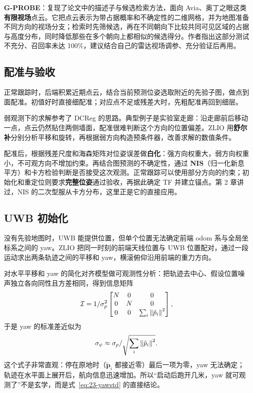 \textbf{G-PROBE}\cite{gprobe2026}：复现了论文中的描述子与候选检索方法，面向 Avia、奥丁之眼这类\textbf{有限视场}点云。它把点云表示为带占据概率和不确定性的二维网格，并为地图准备不同方向的视场分支；检索时先筛候选，再在不同朝向下比较共同可见区域的占据与高度分布，同时降低那些在多个朝向上都相似的候选得分。作者指出这部分测试不充分、召回率未达 100\%，建议结合自己的雷达视场调参、充分验证后再用。

\subsection{配准与验收}

正常跟踪时，后端积累近期点云，结合当前预测位姿选取附近的先验子图，做点到面配准。初值好时直接细配准；对应点不足或残差大时，先粗配准再回到细层。

弱观测下的求解参考了 DCReg 的思路。典型例子是实验室走廊：沿走廊前后移动一点，点云仍然贴住两侧墙面，配准很难判断这个方向的位置偏差。ZLIO 用\textbf{舒尔补}分别分析平移和旋转，再根据弱方向构造预条件器，改善求解的数值条件。

配准后，根据残差尺度和海森矩阵对位姿误差做\textbf{白化}：强方向权重大，弱方向权重小，不可观方向不增加约束。再结合图预测的不确定性，通过 \textbf{NIS}（归一化新息平方）和卡方检验判断是否接受这次观测。正常跟踪可以使用部分方向的约束；初始化和重定位则要求\textbf{完整位姿}通过验收，再据此确定 TF 并建立锚点。第 2 章讲过，NIS 的二次型服从卡方分布，这里正是它的直接应用。

\subsection{UWB 初始化}

没有先验地图时，UWB 能提供位置，但单个位置无法确定前端 odom 系与全局坐标系之间的 yaw。ZLIO 把同一时刻的前端天线位置与 UWB 位置配对，通过一段运动求出两条轨迹之间的平移和 yaw，横滚俯仰沿用前端的重力方向。

对水平平移和 yaw 的简化对齐模型做可观测性分析：把轨迹去中心、假设位置噪声独立各向同性且方差相同，得到信息矩阵
\begin{equation}
\mathcal{I}=1/\sigma_p^{2}
\begin{bmatrix}
N&0&0\\
0&N&0\\
0&0&\sum_i\left\lVert \tilde{p}_i \right\rVert^{2}
\end{bmatrix},
\label{eq:23-uwb-info}
\end{equation}
于是 yaw 的标准差近似为
\begin{equation}
\sigma_\psi\approx\sigma_p/\sqrt{\sum_i\left\lVert \tilde{p}_i \right\rVert^{2}}.
\label{eq:23-yawstd}
\end{equation}
这个式子非常直观：停在原地时（$\tilde{\bm{p}}_i$ 都接近零）最后一项为零，yaw 无法确定；轨迹在水平面上展开后，航向信息迅速增加。所以“启动后跑开几米，yaw 就可观测了”不是玄学，而是式~\eqref{eq:23-yawstd} 的直接结论。

